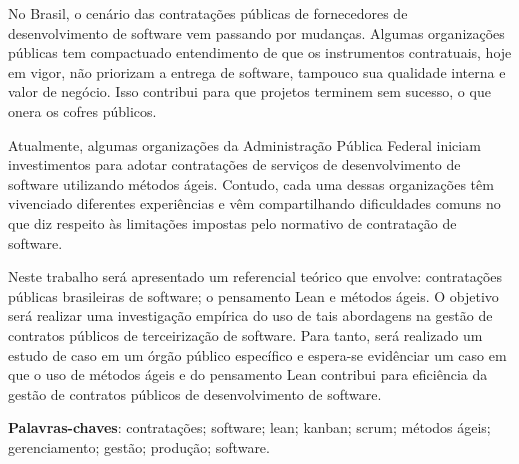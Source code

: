 \begin{resumo}
No Brasil, o cenário das contratações públicas de fornecedores de desenvolvimento de software vem passando por mudanças. Algumas organizações públicas tem compactuado entendimento de que os instrumentos contratuais, hoje em vigor, não priorizam a entrega de software, tampouco sua qualidade interna e valor de negócio. Isso contribui para que projetos terminem sem sucesso, o que onera os cofres públicos.

Atualmente, algumas organizações da Administração Pública Federal iniciam investimentos para adotar contratações de serviços de desenvolvimento de software utilizando métodos ágeis. Contudo, cada uma dessas organizações têm vivenciado diferentes experiências e vêm compartilhando dificuldades comuns no que diz respeito às limitações impostas pelo normativo de contratação de software.

Neste trabalho será apresentado um referencial teórico que envolve: contratações públicas brasileiras de software; o pensamento Lean e métodos ágeis. O objetivo será realizar uma investigação empírica do uso de tais abordagens na gestão de contratos públicos de terceirização de software. Para tanto, será realizado um estudo de caso em um órgão público específico e espera-se evidênciar um caso em que o uso de métodos ágeis e do pensamento Lean contribui para eficiência da gestão de contratos públicos de desenvolvimento de software.

\vspace{\onelineskip}
    
 \noindent
 \textbf{Palavras-chaves}: contratações; software; lean; kanban; scrum; métodos ágeis; gerenciamento; gestão; produção; software.
\end{resumo}
